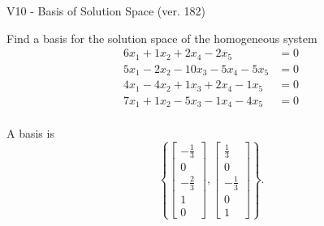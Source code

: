 \begin{exercise}
  \begin{exerciseTitle}V10 - Basis of Solution Space (ver. 182)\end{exerciseTitle}
  \begin{exerciseStatement}
    Find a basis for the solution space of the homogeneous system 
\begin{align*}
 6 x_ 1 + 1 x_ 2 + 2 x_ 4 -2 x_ 5 &= 0  \\ 
  5 x_ 1 -2 x_ 2 -10 x_ 3 -5 x_ 4 -5 x_ 5 &= 0  \\ 
  4 x_ 1 -4 x_ 2 + 1 x_ 3 + 2 x_ 4 -1 x_ 5 &= 0  \\ 
  7 x_ 1 + 1 x_ 2 -5 x_ 3 -1 x_ 4 -4 x_ 5 &= 0  \\ 
 \end{align*}


 
  \end{exerciseStatement}

  \begin{exerciseAnswer}
   A basis is   
\[\left\{\left[\begin{array}{c}
-\frac{1}{3} \\
0 \\
-\frac{2}{3} \\
1 \\
0
\end{array}\right] , \left[\begin{array}{c}
\frac{1}{3} \\
0 \\
-\frac{1}{3} \\
0 \\
1
\end{array}\right]\right\}.\]

  


  \end{exerciseAnswer}
\end{exercise}